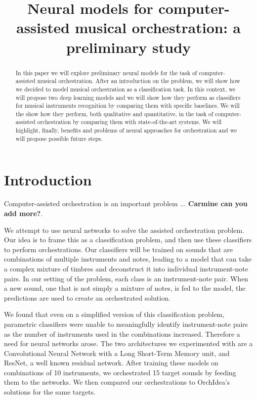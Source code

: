 \documentclass{article}
\title{Neural models for computer-assisted musical orchestration: a preliminary study}
\begin{document}
%
\maketitle
%
\begin{abstract}
In this paper we will explore preliminary neural models for the task of computer-assisted musical orchestration. After an introduction on the problem, we will show how we decided to model musical orchestration as a classification task. In this context, we will propose two deep learning models and we will show how they perform as classifiers for musical instruments recognition by comparing them with specific baselines. We will the show how they perform, both qualitative and quantitative, in the task of computer-assisted orchestration by comparing them with state-of-the-art systems. We will highlight, finally, benefits and problems of neural approaches for orchestration and we will propose possible future steps.
\end{abstract}
%
\section{Introduction}\label{sec:introduction}

Computer-assisted orchestration is an important problem ... \textbf{Carmine can you add more?}.

We attempt to use neural networks to solve the assisted orchestration problem. Our idea is to frame this as a classification problem, and then use these classifiers to perform orchestrations. Our classifiers will be trained on sounds that are combinations of multiple instruments and notes, leading to a model that can take a complex mixture of timbres and deconstruct it into individual instrument-note pairs. In our setting of the problem, each class is an instrument-note pair. When a new sound, one that is not simply a mixture of notes, is fed to the model, the predictions are used to create an orchestrated solution.

We found that even on a simplified version of this classification problem, parametric classifiers were unable to meaningfully identify instrument-note pairs as the number of instruments used in the combinations increased. Therefore a need for neural networks arose. The two architectures we experimented with are a Convolutional Neural Network with a Long Short-Term Memory unit, and ResNet, a well known residual network. After training these models on combinations of 10 instruments, we orchestrated 15 target sounds by feeding them to the networks. We then compared our orchestrations to OrchIdea's solutions for the same targets.
\end{document}
